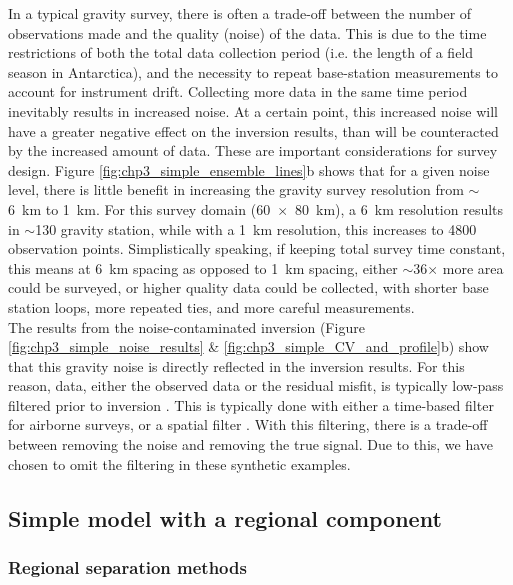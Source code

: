 In a typical gravity survey, there is often a trade-off between the number of observations made and the quality (noise) of the data. This is due to the time restrictions of both the total data collection period (i.e. the length of a field season in Antarctica), and the necessity to repeat base-station measurements to account for instrument drift. Collecting more data in the same time period inevitably results in increased noise. At a certain point, this increased noise will have a greater negative effect on the inversion results, than will be counteracted by the increased amount of data. These are important considerations for survey design. Figure \ref{fig:chp3_simple_ensemble_lines}b shows that for a given noise level, there is little benefit in increasing the gravity survey resolution from $\sim$6~km to 1~km. For this survey domain (60~$\times$~80~km), a 6~km resolution results in $\sim$130 gravity station, while with a 1~km resolution, this increases to 4800 observation points. Simplistically speaking, if keeping total survey time constant, this means at 6~km spacing as opposed to 1~km spacing, either $\sim$36$\times$ more area could be surveyed, or higher quality data could be collected, with shorter base station loops, more repeated ties, and more careful measurements. \\

The results from the noise-contaminated inversion (Figure \ref{fig:chp3_simple_noise_results} \& \ref{fig:chp3_simple_CV_and_profile}b) show that this gravity noise is directly reflected in the inversion results. For this reason, data, either the observed data or the residual misfit, is typically low-pass filtered prior to inversion \citep[i.e.][]{boghosianresolving2015, yangocean2020}. This is typically done with either a time-based filter for airborne surveys, or a spatial filter \citep{jordanaerogravity2010}. With this filtering, there is a trade-off between removing the noise and removing the true signal. Due to this, we have chosen to omit the filtering in these synthetic examples.

\subsection[Regional component]{Simple model with a regional component}

\subsubsection{Regional separation methods}

